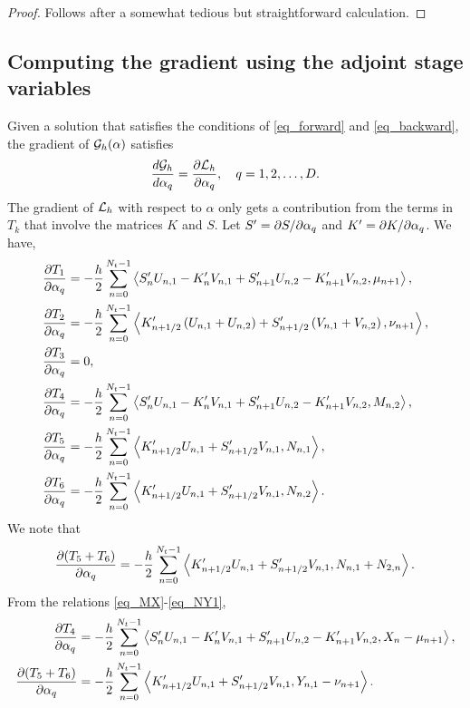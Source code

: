 \documentclass[11pt]{article}
\begin{document}
\begin{proof}
Follows after a somewhat tedious but straightforward calculation.
\end{proof}

\subsection{Computing the gradient using the adjoint stage variables}

Given a solution that satisfies the conditions of \eqref{eq_forward} and \eqref{eq_backward}, the
gradient of ${\cal G}_h(\alpha)$ satisfies
\[
\frac{d{\cal G}_h}{d\alpha_q} = \frac{\partial{\cal L}_h}{\partial \alpha_q},\quad q=1,2,\ldots,D.
\]
The gradient of ${\cal L}_h$ with respect to $\alpha$ only gets a contribution from the terms in $T_k$ that involve the matrices $K$
and $S$. Let $S' = \partial S/\partial \alpha_q$ and $K' = \partial K/\partial \alpha_q$. We have,
\begin{align}
\frac{\partial T_1}{\partial \alpha_q} &=  - \frac{h}{2} \sum_{n=0}^{N_t-1} \left\langle S'_nU_{n,1} -
K'_nV_{n,1} + S'_{n+1}U_{n,2} - K'_{n+1}V_{n,2}, \mu_{n+1} \right\rangle,\\ 
\frac{\partial T_2}{\partial \alpha_q} &= - \frac{h}{2} \sum_{n=0}^{N_t-1} \left\langle K'_{n+1/2} \left(U_{n,1} + U_{n,2}\right) + S'_{n+1/2}\left(
  V_{n,1} +  V_{n,2}\right), \nu_{n+1} \right\rangle,\\
\frac{\partial T_3}{\partial \alpha_q} &= 0,\\
\frac{\partial T_4}{\partial \alpha_q} &= - \frac{h}{2} \sum_{n=0}^{N_t-1} \left\langle S'_nU_{n,1} - K'_nV_{n,1} + S'_{n+1}U_{n,2} -
  K'_{n+1}V_{n,2} , M_{n,2} \right\rangle,\\
\frac{\partial T_5}{\partial \alpha_q} &= - \frac{h}{2} \sum_{n=0}^{N_t-1} \left\langle   K'_{n+1/2} U_{n,1} + S'_{n+1/2} V_{n,1}, N_{n,1} \right\rangle,\\
\frac{\partial T_6}{\partial \alpha_q} &= - \frac{h}{2} \sum_{n=0}^{N_t-1} \left\langle   K'_{n+1/2} U_{n,1} + S'_{n+1/2} V_{n,1}, N_{n,2} \right\rangle.
\end{align}
We note that
\begin{equation}
  \frac{\partial (T_5+T_6)}{\partial \alpha_q} =
  - \frac{h}{2} \sum_{n=0}^{N_t-1} \left\langle K'_{n+1/2} U_{n,1} + S'_{n+1/2} V_{n,1} , N_{n,1} + N_{2,n} \right\rangle.
\end{equation}
From the relations \eqref{eq_MX}-\eqref{eq_NY1},
\begin{align}
\frac{\p T_4}{\p \alpha_q} &= - \frac{h}{2} \sum_{n=0}^{N_t-1} \left\langle S'_nU_{n,1} - K'_nV_{n,1} + S'_{n+1}U_{n,2} -
K'_{n+1}V_{n,2}, X_{n} - \mu_{n+1} \right\rangle,\\
%
  \frac{\p (T_5 + T_6)}{\p \alpha_q} &=
  - \frac{h}{2} \sum_{n=0}^{N_t-1} \left\langle  K'_{n+1/2} U_{n,1} + S'_{n+1/2} V_{n,1}, Y_{n,1} - \nu_{n+1} \right\rangle.
\end{align}
\end{document}
